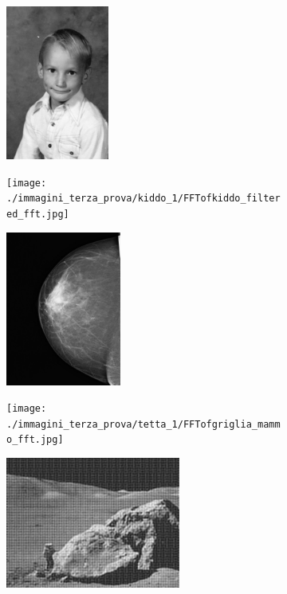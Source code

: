 \documentclass{article}
\begin{document}
\begin{figure}[h]
	\centering
	\begin{subfigure}[b]{0.5\textwidth}
		\centering
		\includegraphics[height=2in]{./immagini_terza_prova/kiddo_1/kiddo_filtered_fft.jpg}
		
	\end{subfigure}%
	\begin{subfigure}[b]{0.5\textwidth}
		\centering
		\texttt{[image: ./immagini\_terza\_prova/kiddo\_1/FFTofkiddo\_filtered\_fft.jpg]}
	
	\end{subfigure}%
	\bigbreak
	

\begin{subfigure}[b]{0.5\textwidth}
	\centering
	\includegraphics[height=2in]{./immagini_terza_prova/tetta_1/griglia_mammo_fft.jpg}
	
\end{subfigure}%
\begin{subfigure}[b]{0.5\textwidth}
	\centering
	\texttt{[image: ./immagini\_terza\_prova/tetta\_1/FFTofgriglia\_mammo\_fft.jpg]}
	
\end{subfigure}%
\bigbreak


\begin{subfigure}[b]{0.5\textwidth}
	\centering
	\includegraphics[height=1.7in]{./immagini_terza_prova/moon_1/moonlanding_fft.jpg}
	

\end{subfigure}
\end{figure}
\end{document}
